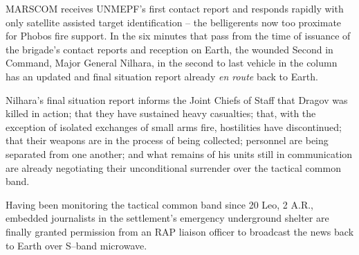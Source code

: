 MARSCOM receives UNMEPF's first contact report and responds rapidly with only satellite assisted target identification -- the belligerents now too proximate for Phobos fire support. In the six minutes that pass from the time of issuance of the brigade's contact reports and reception on Earth, the wounded Second in Command, Major General Nilhara, in the second to last vehicle in the column has an updated and final situation report already {\it en route} back to Earth.

Nilhara's final situation report informs the Joint Chiefs of Staff that Dragov was killed in action; that they have sustained heavy casualties; that, with the exception of isolated exchanges of small arms fire, hostilities have discontinued; that their weapons are in the process of being collected; personnel are being separated from one another; and what remains of his units still in communication are already negotiating their unconditional surrender over the tactical common band.

Having been monitoring the tactical common band since 20 Leo, 2 A.R., embedded journalists in the settlement's emergency underground shelter are finally granted permission from an RAP liaison officer to broadcast the news back to Earth over S--band microwave.
\StopTimelineDate

